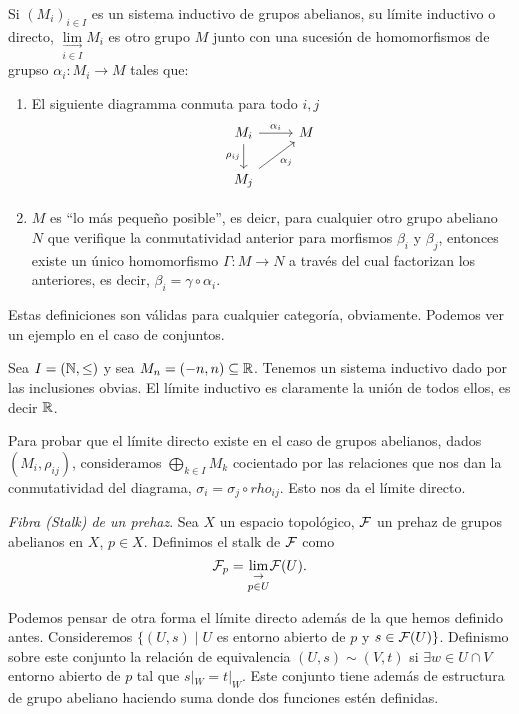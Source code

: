 \documentclass[GA.tex]{subfiles}
\begin{document}
Si $(M_i)_{i\in I}$ es un sistema inductivo de grupos abelianos, su límite inductivo o directo, $\underset{i\in I}{\underset{\rightarrow}{\lim}}M_i$ es otro grupo $M$ junto con una sucesión de homomorfismos de grupso $\alpha_i:M_i\to M$ tales que:
\begin{enumerate}
\item El siguiente diagramma conmuta para todo $i,j$
\[
\begin{tikzcd}
M_i\arrow[r, "\alpha_i"]\arrow[d, "\rho_{ij}"'] & M\\
M_j\arrow[ur, "\alpha_j"'] &
\end{tikzcd}
\]
\item $M$ es ``lo más pequeño posible'', es deicr, para cualquier otro grupo abeliano $N$ que verifique la conmutatividad anterior para morfismos $\beta_i$ y $\beta_j$, entonces existe un único homomorfismo $\Gamma:M\to N$ a través del cual factorizan los anteriores, es decir, $\beta_i=\gamma\circ\alpha_i$. 
\end{enumerate} 

Estas definiciones son válidas para cualquier categoría, obviamente. Podemos ver un ejemplo en el caso de conjuntos. 

\begin{ej}
Sea $I=(\mathbb{N}, \leq)$ y sea $M_n=(-n,n)\subseteq\mathbb{R}$. Tenemos un sistema inductivo dado por las inclusiones obvias. El límite inductivo es claramente la unión de todos ellos, es decir $\mathbb{R}$. 
\end{ej}

Para probar que el límite directo existe en el caso de grupos abelianos, dados $(M_i,\rho_{ij})$, consideramos $\bigoplus_{k\in I}M_k$ cocientado por las relaciones que nos dan la conmutatividad del diagrama, $\sigma_i=\sigma_j\circ rho_{ij}$. Esto nos da el límite directo.


\begin{defi}
\emph{Fibra (Stalk) de un prehaz}. Sea $X$ un espacio topológico, $\mathcal{F}$ un prehaz de grupos abelianos en $X$, $p\in X$. Definimos el stalk de $\mathcal{F}$ como
\[
\mathcal{F}_p=\underset{p\in U}{\underset{\rightarrow}{\lim}} \mathcal{F}(U).
\]
\end{defi}

Podemos pensar de otra forma el límite directo además de la que hemos definido antes. Consideremos $\{(U,s)\mid U$ es entorno abierto de $p$ y $s\in\mathcal{F}(U)\}$. Definismo sobre este conjunto la relación de equivalencia $(U,s)\sim (V,t)$ si $\exists w\in U\cap V$ entorno abierto de $p$ tal que $s|_W=t|_W$. Este conjunto tiene además de estructura de grupo abeliano haciendo suma donde dos funciones estén definidas. 
\end{document}
